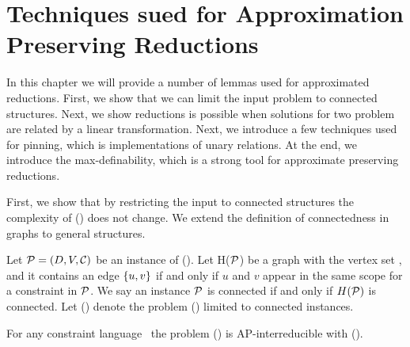 \chapter{Techniques sued for Approximation Preserving Reductions}
In this chapter we will provide a number of lemmas used for approximated reductions.
First, we show that we can limit the input problem to connected structures. 
Next, we show reductions is possible when solutions for two problem are related by a 
linear transformation. Next, we introduce a few techniques used for pinning, which is
implementations of unary relations. At the end, we introduce the max-definability, which 
is a strong tool for approximate preserving reductions. 

First, we show that by restricting the input to connected structures the complexity of 
\ccsp(\mrelset) does not change. We extend the definition of connectedness in graphs
to general structures.

Let \(\mathcal{P} = (D, V, \mathcal{C})\) be an instance of \ccsp(\mrelset)\@.
Let H(\(\mathcal{P}\)) be a graph
with the vertex set \mV, and it contains an edge \(\{{u,v}\}\) if and only if 
\(u\) and \(v\) appear in the same scope for a constraint in \(\mathcal{P}\)\@.
We say an instance \(\mathcal{P}\) is connected if and only if \(H(\mathcal{P})\) is connected.
Let \cccsp(\mrelset) denote the problem \ccsp(\mrelset) limited to connected instances.

\begin{lemma} \label{lem:connected}
For any constraint language \mrelset\ the problem \ccsp(\mrelset) is AP-interreducible with
\cccsp(\mrelset)\@.
\end{lemma}

